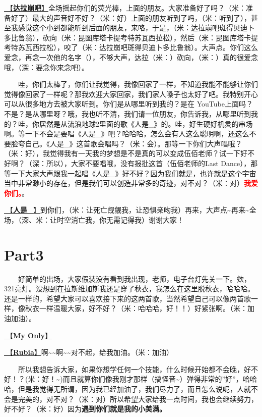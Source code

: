 \documentclass[]{ctexbook}
\begin{document}
\hyperref[dalabengba]{🎵【\textbf{达拉崩吧}】}全场摇起你们的荧光棒，上面的朋友。大家准备好了吗？（米：准备好了）最大的声音好不好？（米：好）上面的朋友听到了吗，（米：听到了），甚至我感觉这个小到都能听到后面的朋友，来咯，于是，（米：达拉崩吧斑得贝迪卜多比鲁翁），砍向（米：昆图库塔卡提考特苏瓦西拉松），然后（米：昆图库塔卡提考特苏瓦西拉松），咬了（米：达拉崩吧斑得贝迪卜多比鲁翁）。大声点。你们这么爱念，再念一次他的名字（），不够大声，达拉（米：）砍向，（米：）真的很爱念哦，（深：要念你来念吧）。

  哇，你们太棒了，你们让我觉得，我像回家了一样，不知道我能不能够让你们觉得像回家了一样呢？那我欢迎大家回家，我们家人嗓子也太好了吧。我特别开心可以从很多地方去被大家听到。你们是从哪里听到我的？是在 YouTube上面吗？不是？是从哪里呀？哦，我也听不清，我们请一位朋友，你告诉我，从哪里听到我的？哇，你居然是从流浪地球2里面的歌《人是\_》的。哇，好生硬好机灵的串场啊。等一下不会是要唱《人是\_》吧？哈哈哈，怎么会有人这么聪明啊，还这么不要脸夸自己。《人是\_》这首歌会唱吗？（米：会）。那等一下你们大声唱哦？（米：好），我觉得我有一天我的梦想是不是真的可以变成伍佰老师？试一下好不好啊？（深：所以），大家不要唱哦，没有报批这首（伍佰老师的Last Dance），那等一下大家大声跟我一起唱《人是\_》好不好？因为我们就是，也许就是这个宇宙当中非常渺小的存在，但是我们可以创造非常多的奇迹，对不对？（米：对）\textbf{\textcolor{red}{我爱你们。}}。

\hyperref[renshi]{🎵【\textbf{人是\_}】}到你们，（米：让死亡觊觎我，让恐惧亲吻我）再来，大声点\textasciitilde 再来\textasciitilde 全场，（深、米：让时空消亡我，你无需记得我）谢谢大家！

\section{Part3}\label{LasVegas-20250228-part3}

  好简单的出场，大家假装没有看到我出现，老师，电子台灯先关一下。欸，321亮灯。没想到在拉斯维加斯我还是穿了秋衣，我怎么在这里脱秋衣，哈哈哈。还是一样的，希望大家可以喜欢接下来的这两首歌，当然希望自己可以像两首歌一样，像秋衣一样温暖大家，好不好？（米：哈哈哈，好！！）好紧张啊。（米：加油加油）。

\hyperref[my-only]{🎵【\textbf{My Only}】}

\hyperref[rubia]{🎵【\textbf{Rubia}】}啊\textasciitilde\textasciitilde 啊\textasciitilde\textasciitilde 对不起，给我加油。（米：加油）

  所以我想告诉大家，如果你想学任何一个技能，什么时候开始都不会晚，好不好！？(米：好！\textasciitilde)而且就算你们像我刚才那样（搞怪音\textasciitilde）弹得非常的''好''，哈哈哈，但是我觉得无所谓，因为我已经加油了，我们尽力了，而且怎么说呢，人就不会是完美的，对不对？（米：对）所以希望大家给我一点时间，我也会继续努力，好不好？（米：好）因为\textbf{遇到你们就是我的小美满。}
\end{document}
